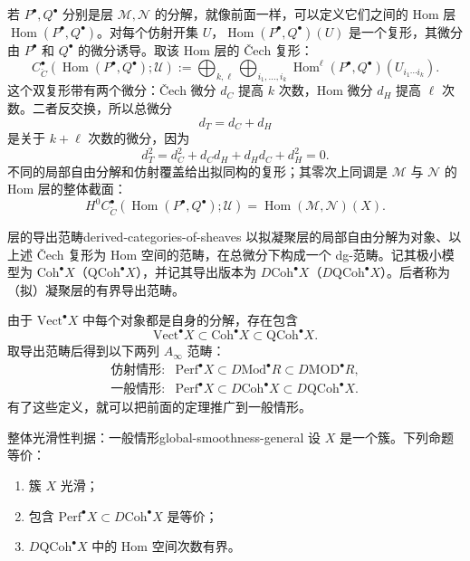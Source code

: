若 $P^{\bullet},Q^{\bullet}$ 分别是层 $\mathcal M,\mathcal N$ 的分解，就像前面一样，可以定义它们之间的 Hom 层 $\operatorname{Hom}(P^{\bullet},Q^{\bullet})$。对每个仿射开集 $U$，$\operatorname{Hom}(P^{\bullet},Q^{\bullet})(U)$ 是一个复形，其微分由 $P^{\bullet}$ 和 $Q^{\bullet}$ 的微分诱导。取该 Hom 层的 Čech 复形：
\[
  C^\bullet_{\check C}(\operatorname{Hom}(P^{\bullet},Q^{\bullet});\mathcal U)
  :=\bigoplus_{k,\ell}\bigoplus_{i_1,\ldots,i_k}
  \operatorname{Hom}^{\ell}(P^{\bullet},Q^{\bullet})(U_{i_1\cdots i_k}).
\]
这个双复形带有两个微分：Čech 微分 $d_C$ 提高 $k$ 次数，Hom 微分 $d_H$ 提高 $\ell$ 次数。二者反交换，所以总微分
\[
  d_T=d_C+d_H
\]
是关于 $k+\ell$ 次数的微分，因为
\[
  d_T^2=d_C^2+d_Cd_H+d_Hd_C+d_H^2=0.
\]
不同的局部自由分解和仿射覆盖给出拟同构的复形；其零次上同调是 $\mathcal M$ 与 $\mathcal N$ 的 Hom 层的整体截面：
\[
  H^0C^\bullet_{\check C}(\operatorname{Hom}(P^{\bullet},Q^{\bullet});\mathcal U)
  =\operatorname{Hom}(\mathcal M,\mathcal N)(X).
\]

\begin{definition}{层的导出范畴}{derived-categories-of-sheaves}
以拟凝聚层的局部自由分解为对象、以上述 Čech 复形为 Hom 空间的范畴，在总微分下构成一个 dg-范畴。记其极小模型为 $\mathrm{Coh}^{\bullet}X$（$\mathrm{QCoh}^{\bullet}X$），并记其导出版本为 $D\mathrm{Coh}^{\bullet}X$（$D\mathrm{QCoh}^{\bullet}X$）。后者称为（拟）凝聚层的有界导出范畴。
\end{definition}

由于 $\mathrm{Vect}^{\bullet}X$ 中每个对象都是自身的分解，存在包含
\[
  \mathrm{Vect}^{\bullet}X\subset\mathrm{Coh}^{\bullet}X
  \subset\mathrm{QCoh}^{\bullet}X.
\]
取导出范畴后得到以下两列 $A_\infty$ 范畴：
\[
\begin{array}{ll}
  \text{仿射情形:}&\mathrm{Perf}^{\bullet}X\subset D\mathrm{Mod}^{\bullet}R
    \subset D\mathrm{MOD}^{\bullet}R,\\
  \text{一般情形:}&\mathrm{Perf}^{\bullet}X\subset D\mathrm{Coh}^{\bullet}X
    \subset D\mathrm{QCoh}^{\bullet}X.
\end{array}
\]
有了这些定义，就可以把前面的定理推广到一般情形。

\begin{theorem}{整体光滑性判据：一般情形}{global-smoothness-general}
设 $X$ 是一个簇。下列命题等价：
\begin{enumerate}[label=(\roman*)]
  \item 簇 $X$ 光滑；
  \item 包含 $\mathrm{Perf}^{\bullet}X\subset D\mathrm{Coh}^{\bullet}X$ 是等价；
  \item $D\mathrm{QCoh}^{\bullet}X$ 中的 Hom 空间次数有界。
\end{enumerate}
\end{theorem}

